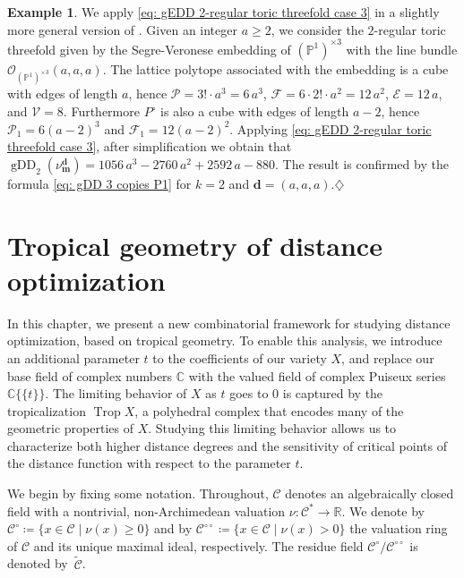 \documentclass[11pt,reqno]{amsart}
\numberwithin{equation}{section}
\theoremstyle{plain}
\numberwithin{theorem}{section}
\theoremstyle{definition}
\newtheorem{example}[theorem]{Example}
\renewcommand{\P}{\mathbb{P}}
\newcommand{\R}{\mathbb{R}}
\newcommand{\C}{\mathbb{C}}
\newcommand{\CC}{\mathcal{C}}
\newcommand{\VV}{\mathcal{V}}
\newcommand{\EE}{\mathcal{E}}
\newcommand{\FF}{\mathcal{F}}
\newcommand{\OO}{\mathcal{O}}
\newcommand{\PP}{\mathcal{P}}
\def\bd{{\boldsymbol{d}}}
\def\bm{{\boldsymbol{m}}}
\DeclareMathOperator{\Trop}{Trop}
\newcommand{\gDD}{\operatorname{gDD}}
\begin{document}
\begin{example}
We apply \eqref{eq: gEDD 2-regular toric threefold case 3} in a slightly more general version of \cite[Example 3.8]{Higher_duality_and_toric}. Given an integer $a\ge 2$, we consider the $2$-regular toric threefold given by the Segre-Veronese embedding of $(\P^1)^{\times 3}$ with the line bundle $\OO_{(\P^1)^{\times 3}}(a,a,a)$. The lattice polytope associated with the embedding is a cube with edges of length $a$, hence $\PP=3!\cdot a^3=6\,a^3$, $\FF=6\cdot 2!\cdot a^2=12\,a^2$, $\EE=12\,a$, and $\VV=8$. Furthermore $P^\circ$ is also a cube with edges of length $a-2$, hence $\PP_1=6(a-2)^3$ and $\FF_1=12(a-2)^2$. Applying \eqref{eq: gEDD 2-regular toric threefold case 3}, after simplification we obtain that $\gDD_2(\nu_\bm^\bd)=1056\,a^3-2760\,a^2+2592\,a-880$. The result is confirmed by the formula \eqref{eq: gDD 3 copies P1} for $k=2$ and $\bd=(a,a,a)$.\hfill$\diamondsuit$
\end{example}





















\section{Tropical geometry of distance optimization}\label{sec: tropical}

In this chapter, we present a new combinatorial framework for studying distance optimization, based on tropical geometry. To enable this analysis, we introduce an additional parameter $t$ to the coefficients of our variety $X$, and replace our base field of complex numbers $\C$ with the valued field of complex Puiseux series $\C\{\{t\}\}$. 
The limiting behavior of $X$ as $t$ goes to $0$ is captured by the tropicalization $\Trop X$, a polyhedral complex that encodes many of the geometric properties of $X$. 
Studying this limiting behavior allows us to characterize both higher distance degrees and the sensitivity of critical points of the distance function with respect to the parameter $t$.


We begin by fixing some notation.
Throughout, $\CC$ denotes an algebraically closed field with a nontrivial, non-Archimedean valuation $\nu \colon \CC^* \to \R$.
We denote by $\CC^{\circ} \coloneqq \big\{ x \in \CC \mid  \nu(x) \ge 0 \big\}$  and by $\CC^{\circ \circ} \coloneqq \big\{ x \in \CC \mid  \nu(x) > 0 \big\}$ the valuation ring of $\CC$ and its unique maximal ideal, respectively. The residue field $\CC^\circ/ \CC^{\circ\circ}$ is denoted by~$\widetilde{\CC}$.
\end{document}
